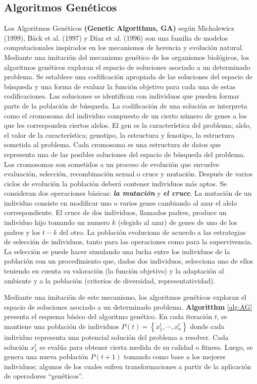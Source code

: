 \documentclass[9pt,a4paper,twoside]{rho-class/rho}
\begin{document}
        \subsection{Algoritmos Genéticos}
            Los Algoritmos Genéticos \textbf{(Genetic Algorithms, GA)} según Michalewicz (1999), Bäck et al. (1997) y Díaz et al. (1996)\cite{Michalewicz1999, Back1997, Diaz1996} son una familia de modelos computacionales inspirados en los mecanismos de herencia y evolución natural.\vspace{1mm} \\ 
            Mediante una imitación del mecanismo genético de los organismos biológicos, los algoritmos genéticos exploran el espacio de soluciones asociado a un determinado problema. Se establece una codificación apropiada de las soluciones del espacio de búsqueda y una forma de evaluar la función objetivo para cada una de estas codificaciones. Las soluciones se identifican con individuos que pueden formar parte de la población de búsqueda. La codificación de una solución se interpreta como el cromosoma del individuo compuesto de un cierto número de genes a los que les corresponden ciertos alelos. El gen es la característica del problema; alelo, el valor de la característica; genotipo, la estructura y fenotipo, la estructura sometida al problema. Cada cromosoma es una estructura de datos que representa una de las posibles soluciones del espacio de búsqueda del problema. Los cromosomas son sometidos a un proceso de evolución que envuelve evaluación, selección, recombinación sexual o cruce y mutación. Después de varios ciclos de evolución la población deberá contener individuos más aptos.
            Se consideran dos operaciones básicas: \textbf{\textit{la mutación}} y \textbf{\textit{el cruce}}. La mutación de un individuo consiste en modificar uno o varios genes cambiando al azar el alelo correspondiente. El cruce de dos individuos, llamados padres, produce un individuo hijo tomando un numero $k$ (elegido al azar) de genes de uno de los padres y los $t-k$ del otro. La población evoluciona de acuerdo a las estrategias de selección de individuos, tanto para las operaciones como para la supervivencia. La selección se puede hacer simulando una lucha entre los individuos de la población con un procedimiento que, dados dos individuos, selecciona uno de ellos teniendo en cuenta su valoración (la función objetivo) y la adaptación al ambiente y a la población (criterios de diversidad, representatividad).

            Mediante una imitación de este mecanismo, los algoritmos genéticos exploran el espacio de soluciones asociado a un determinado problema. \textbf{Algoritthm} \ref{alg:AG} presenta el esquema básico del algoritmo genético. En cada iteración $t$, se mantiene una población de individuos $P\left(t\right)=\left\{{x}_{1}^{t},\cdots, {x}_{n}^{t}\right\}$ donde cada individuo representa una potencial solución del problema a resolver. Cada solución ${x}_{1}^{t}$ se evalúa para obtener cierta medida de su calidad o fitness. Luego, se genera una nueva población $P\left(t + 1\right)$ tomando como base a los mejores individuos; algunos de los cuales sufren transformaciones a partir de la aplicación de operadores “genéticos”.
\end{document}
